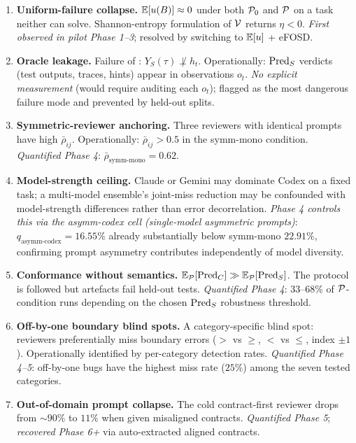 \begin{enumerate}[leftmargin=2em]
\item \textbf{Uniform-failure collapse.} $\mathbb{E}[u(B)] \approx 0$ under both $\mathcal{P}_0$ and $\mathcal{P}$ on a task neither can solve. Shannon-entropy formulation of $\mathcal{V}$ returns $\eta < 0$. \emph{First observed in pilot Phase 1--3}; resolved by switching to $\mathbb{E}[u]$ + eFOSD.

\item \textbf{Oracle leakage.} Failure of : $Y_S(\tau) \not\perp h_t$. Operationally: $\mathrm{Pred}_S$ verdicts (test outputs, traces, hints) appear in observations $o_t$. \emph{No explicit measurement} (would require auditing each $o_t$); flagged as the most dangerous failure mode and prevented by held-out splits.

\item \textbf{Symmetric-reviewer anchoring.} Three reviewers with identical prompts have high $\bar{\rho}_{ij}$. Operationally: $\bar{\rho}_{ij} > 0.5$ in the symm-mono condition. \emph{Quantified Phase 4}: $\bar{\rho}_{\text{symm-mono}} = 0.62$.

\item \textbf{Model-strength ceiling.} Claude or Gemini may dominate Codex on a fixed task; a multi-model ensemble's joint-miss reduction may be confounded with model-strength differences rather than error decorrelation. \emph{Phase 4 controls this via the asymm-codex cell (single-model asymmetric prompts)}: $q_{\text{asymm-codex}} = 16.55\%$ already substantially below symm-mono $22.91\%$, confirming prompt asymmetry contributes independently of model diversity.

\item \textbf{Conformance without semantics.} $\mathbb{E}_{\mathcal{P}}[\mathrm{Pred}_C] \gg \mathbb{E}_{\mathcal{P}}[\mathrm{Pred}_S]$. The protocol is followed but artefacts fail held-out tests. \emph{Quantified Phase 4}: $33$--$68\%$ of $\mathcal{P}$-condition runs depending on the chosen $\mathrm{Pred}_S$ robustness threshold.

\item \textbf{Off-by-one boundary blind spots.} A category-specific blind spot: reviewers preferentially miss boundary errors ($>$ vs $\ge$, $<$ vs $\le$, index $\pm 1$). Operationally identified by per-category detection rates. \emph{Quantified Phase 4--5}: off-by-one bugs have the highest miss rate ($25\%$) among the seven tested categories.

\item \textbf{Out-of-domain prompt collapse.} The cold contract-first reviewer drops from $\sim\!90\%$ to $11\%$ when given misaligned contracts. \emph{Quantified Phase 5}; \emph{recovered Phase 6+} via auto-extracted aligned contracts.


\end{enumerate}
